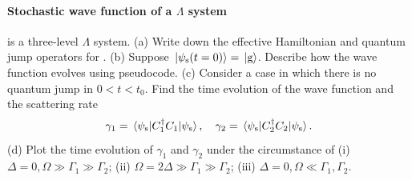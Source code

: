 \documentclass[hyperref, a4paper]{article}
\begin{document}
\paragraph{Stochastic wave function of a $\Lambda$ system}  is a three-level $\Lambda$ system.
(a) Write down the effective Hamiltonian and quantum jump operators for .
(b) Suppose $\ket*{\psi_\text{s}(t=0)} = \ket*{\text{g}}$. Describe how the wave function evolves using pseudocode.
(c) Consider a case in which there is no quantum jump in $0 < t < t_0$. Find the time evolution of the 
wave function and the scattering rate 
\begin{equation}
    \gamma_1 = \expval*{C_1^\dagger C_1}{\psi_\text{s}}, \quad \gamma_2 = \expval*{C_2^\dagger C_2}{\psi_\text{s}}.
\end{equation}
(d) Plot the time evolution of $\gamma_1$ and $\gamma_2$ under the circumstance of
(i) $\Delta = 0, \Omega \gg \Gamma_1 \gg \Gamma_2$;
(ii) $\Omega = 2 \Delta \gg \Gamma_1 \gg \Gamma_2$;
(iii) $\Delta = 0, \Omega \ll \Gamma_1 , \Gamma_2$.
\end{document}
